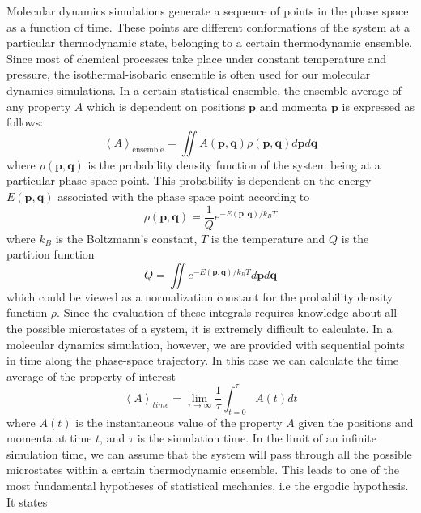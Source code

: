 \documentclass[11pt]{report}
\begin{document}
Molecular dynamics simulations generate a sequence of points 
in the phase space as a function of time. These points are 
different conformations of the system at a particular 
thermodynamic state, belonging to a certain thermodynamic
ensemble. Since most of chemical processes take place under
constant temperature and pressure, the isothermal-isobaric
ensemble is often used for our molecular dynamics
simulations. In a certain statistical ensemble, the ensemble
average of any property $A$ which is dependent on positions
$\mathbf{p}$ and momenta $\mathbf{p}$ is expressed as follows:
\begin{equation}
\label{e:I-ensemble}
\left<A \right>_\text{ensemble} =  \iint A(\mathbf{p},\mathbf{q}) \rho (\mathbf{p},\mathbf{q})d\mathbf{p} d\mathbf{q}
\end{equation}
where $\rho(\mathbf{p},\mathbf{q})$ is the probability density
function of the system being at a particular phase space
point. This probability is dependent on the energy $E(\mathbf{p},\mathbf{q})$ associated
with the phase space point according to
\begin{equation}
\label{e:I-rho}
\rho(\mathbf{p},\mathbf{q}) = \frac{1}{Q}e^{-E(\mathbf{p},\mathbf{q})/k_{B}T}
\end{equation}
where $k_B$ is the Boltzmann's constant, $T$ is the temperature
and $Q$ is the partition function 
\begin{equation}
Q = \iint e^{-E(\mathbf{p},\mathbf{q})/k_{B}T}
d\mathbf{p} d\mathbf{q}
\end{equation}
which could be viewed as a normalization constant for
the probability density function $\rho$. 
Since the evaluation of these integrals requires knowledge about
all the possible microstates of a system, it is extremely
difficult to calculate.
In a molecular dynamics simulation, however, we are provided
with sequential points in time along the phase-space
trajectory. In this case we can calculate the time average of the
property of interest
\begin{equation}
\label{e:I-timeA}
\left< A \right>_{time}  = \lim_{\tau\to\infty} \frac{1}{\tau} \int_{t=0}^{\tau} A(t) dt
\end{equation} 
where $A(t)$ is the instantaneous value of the 
property $A$ given the positions and momenta at
time $t$, and $\tau$ is the simulation time.
In the limit of an infinite simulation time,
we can assume that the system will pass through all the
possible microstates within a certain thermodynamic
ensemble. 
This leads to one of
the most fundamental hypotheses of statistical mechanics, i.e the ergodic hypothesis. It states
\end{document}
